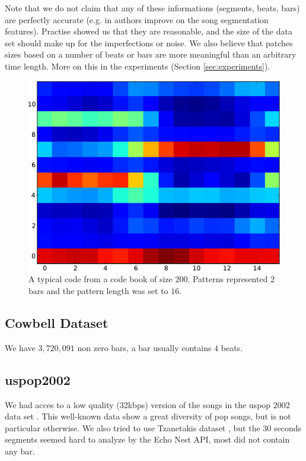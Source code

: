 \documentclass{article}
\begin{document}
Note that we do not claim that any of these informations (segments, beats, bars)
are perfectly accurate (e.g. in \cite{Barrington2009a} authors improve on the
song segmentation features). Practise showed us that they are reasonable, 
and the size of the data set should make up for the imperfections or noise.
We also believe that patches sizes based on a number of beats or bars are more
meaningful than an arbitrary time length. More on this in the experiments
(Section \ref{sec:experiments}).


\begin{figure}[htb]
\begin{center}
\includegraphics[width=.8\columnwidth]{code}
\end{center}
\caption{{A typical code from a code book of size $200$. Patterns represented
$2$ bars and the pattern length was set to $16$.}}
\label{fig:code}
\end{figure}

\subsection{Cowbell Dataset}
We have $3,720,091$ non zero bars, a bar usually contains
$4$ beats.


\subsection{uspop2002}
We had acces to a low quality (32kbps) version of the songs in the uspop 2002 data
set \cite{uspop2002}.
This well-known data show a great diversity of pop songs, but is not particular
otherwise. We also tried to use Tzanetakis dataset \cite{Tzanetakis2002a}, but 
the $30$ seconds segments seemed hard to analyze by the Echo Nest API, most did
not contain any bar.
\end{document}
